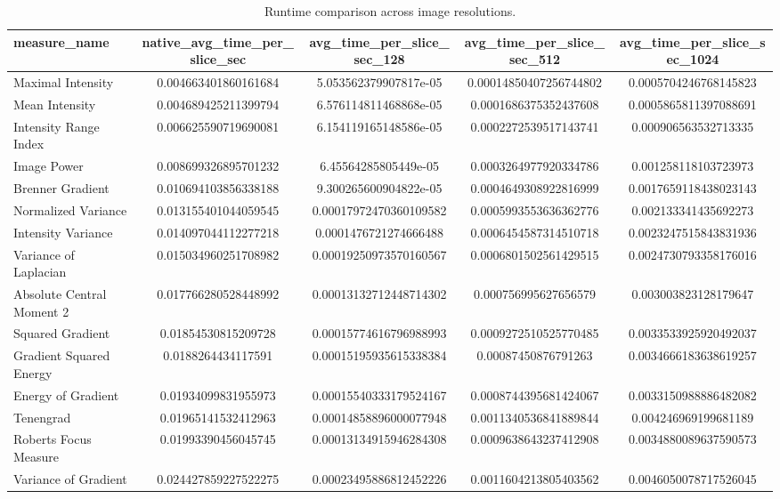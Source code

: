 \begin{table}[t]
\centering
\caption{Runtime comparison across image resolutions.}
\begin{tabular}{lcccc}
\hline
measure_name & native_avg_time_per_slice_sec & avg_time_per_slice_sec_128 & avg_time_per_slice_sec_512 & avg_time_per_slice_sec_1024 \\
\hline
Maximal Intensity & 0.004663401860161684 & 5.053562379907817e-05 & 0.00014850407256744802 & 0.0005704246768145823 \\
Mean Intensity & 0.004689425211399794 & 6.576114811468868e-05 & 0.0001686375352437608 & 0.0005865811397088691 \\
Intensity Range Index & 0.006625590719690081 & 6.154119165148586e-05 & 0.0002272539517143741 & 0.000906563532713335 \\
Image Power & 0.008699326895701232 & 6.45564285805449e-05 & 0.0003264977920334786 & 0.001258118103723973 \\
Brenner Gradient & 0.010694103856338188 & 9.300265600904822e-05 & 0.0004649308922816999 & 0.0017659118438023143 \\
Normalized Variance & 0.013155401044059545 & 0.00017972470360109582 & 0.0005993553636362776 & 0.002133341435692273 \\
Intensity Variance & 0.014097044112277218 & 0.0001476721274666488 & 0.0006454587314510718 & 0.0023247515843831936 \\
Variance of Laplacian & 0.015034960251708982 & 0.00019250973570160567 & 0.0006801502561429515 & 0.0024730793358176016 \\
Absolute Central Moment 2 & 0.017766280528448992 & 0.00013132712448714302 & 0.000756995627656579 & 0.003003823128179647 \\
Squared Gradient & 0.01854530815209728 & 0.00015774616796988993 & 0.0009272510525770485 & 0.0033533925920492037 \\
Gradient Squared Energy & 0.0188264434117591 & 0.00015195935615338384 & 0.00087450876791263 & 0.0034666183638619257 \\
Energy of Gradient & 0.01934099831955973 & 0.00015540333179524167 & 0.0008744395681424067 & 0.0033150988886482082 \\
Tenengrad & 0.01965141532412963 & 0.00014858896000077948 & 0.0011340536841889844 & 0.004246969199681189 \\
Roberts Focus Measure & 0.01993390456045745 & 0.00013134915946284308 & 0.0009638643237412908 & 0.0034880089637590573 \\
Variance of Gradient & 0.024427859227522275 & 0.00023495886812452226 & 0.0011604213805403562 & 0.0046050078717526045 \\
\hline
\end{tabular}
\end{table}